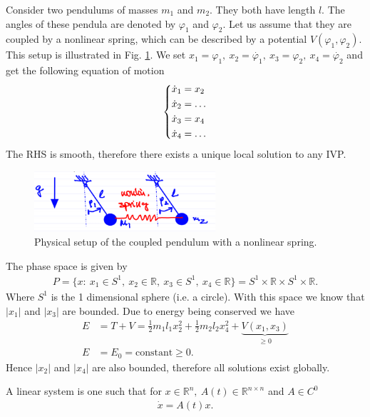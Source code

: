 \begin{ex} Consider two pendulums of masses $m_1$ and $m_2$. They both have  length $l$. The angles of these pendula are denoted by $\varphi_1$ and $\varphi_2$. Let us assume that they are coupled by a nonlinear spring, which can be described by a potential $V(\varphi_1, \varphi_2)$. This setup is illustrated in Fig. \ref{fig:chap1:6}. 
	We set $x_1 = \varphi_1,\ x_2 = \dot{\varphi_1},\ x_3 = \varphi_2,\ x_4=\dot{\varphi_2} $ and get the following equation of motion
\begin{align}
	\begin{dcases}
		\dot{x}_1 = x_2 \\ \dot{x}_2 = \ldots \\ \dot{x}_3 = x_4 \\ \dot{x}_4 = \ldots
	\end{dcases}
\end{align}
The RHS is smooth, therefore there exists a unique local solution to any IVP.
\begin{figure}[h]
	\centering
	\includegraphics[width=0.6\textwidth]{figures/ch1/6coupled_pendulum.png}
	\caption{Physical setup of the coupled pendulum with a nonlinear spring.}
	\label{fig:chap1:6}
\end{figure}
The phase space is given by 
\begin{align}
	P = \{x:\ x_1 \in S^1,\ x_2 \in \mathbb{R},\ x_3 \in S^1,\ x_4 \in \mathbb{R} \} = S^1 \times \mathbb{R}\times S^1 \times \mathbb{R}.
\end{align}
Where $S^1$ is the 1 dimensional sphere (i.e. a circle). With this space we know that $|x_1|$ and $|x_3|$ are bounded. Due to energy being conserved we have
\begin{align}
	E &= T+V = \frac{1}{2}m_1 l_1 x_2^2 + \frac{1}{2}m_2 l_2 x_4^2 + \underbrace{V(x_1, x_3)}_{\geq 0}\\
	E &= E_0 =  \textrm{constant} \geq 0.
\end{align}
Hence $|x_2|$ and $|x_4|$ are also bounded, therefore all solutions exist globally.
\end{ex}
\begin{definition}
	A linear system is one such that for $x\in \mathbb{R}^{n},\ A(t) \in \mathbb{R}^{n\times n}$ and $A\in C^0$ 
	\begin{align}
		\boxed{\dot{x} = A(t) x.}
	\end{align}
\end{definition}

